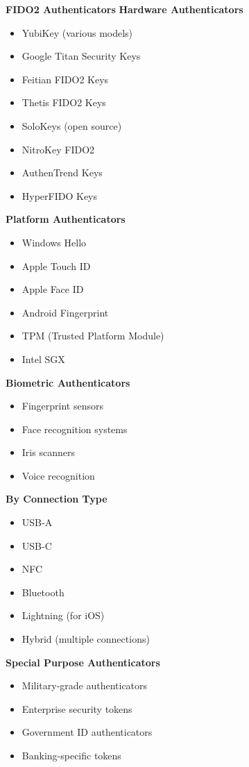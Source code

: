 \textbf{FIDO2 Authenticators}
\textbf{Hardware Authenticators}
\begin{itemize}
    \item YubiKey (various models)
    \item Google Titan Security Keys
    \item Feitian FIDO2 Keys
    \item Thetis FIDO2 Keys
    \item SoloKeys (open source)
    \item NitroKey FIDO2
    \item AuthenTrend Keys
    \item HyperFIDO Keys
\end{itemize}

\textbf{Platform Authenticators}
\begin{itemize}
    \item Windows Hello
    \item Apple Touch ID
    \item Apple Face ID
    \item Android Fingerprint
    \item TPM (Trusted Platform Module)
    \item Intel SGX
\end{itemize}

\textbf{Biometric Authenticators}
\begin{itemize}
    \item Fingerprint sensors
    \item Face recognition systems
    \item Iris scanners
    \item Voice recognition
\end{itemize}

\textbf{By Connection Type}
\begin{itemize}
    \item USB-A
    \item USB-C
    \item NFC
    \item Bluetooth
    \item Lightning (for iOS)
    \item Hybrid (multiple connections)
\end{itemize}

\textbf{Special Purpose Authenticators}
\begin{itemize}
    \item Military-grade authenticators
    \item Enterprise security tokens
    \item Government ID authenticators
    \item Banking-specific tokens
\end{itemize}

